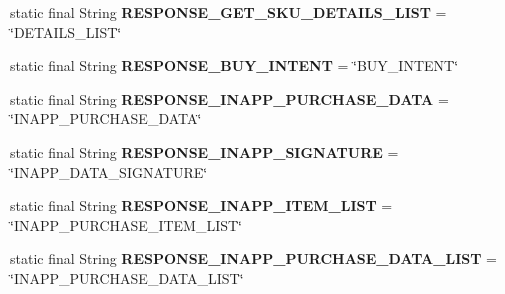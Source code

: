 \begin{DoxyCompactItemize}
\item 
\mbox{\label{classorg_1_1cocos2dx_1_1plugin_1_1util_1_1IabHelper_a63e0f9791ba6e5e4af0da4b0020474f4}} 
static final String {\bfseries R\+E\+S\+P\+O\+N\+S\+E\+\_\+\+G\+E\+T\+\_\+\+S\+K\+U\+\_\+\+D\+E\+T\+A\+I\+L\+S\+\_\+\+L\+I\+ST} = \char`\"{}D\+E\+T\+A\+I\+L\+S\+\_\+\+L\+I\+ST\char`\"{}
\item 
\mbox{\label{classorg_1_1cocos2dx_1_1plugin_1_1util_1_1IabHelper_a2e13b89999d88713b3d85d83e86e7f65}} 
static final String {\bfseries R\+E\+S\+P\+O\+N\+S\+E\+\_\+\+B\+U\+Y\+\_\+\+I\+N\+T\+E\+NT} = \char`\"{}B\+U\+Y\+\_\+\+I\+N\+T\+E\+NT\char`\"{}
\item 
\mbox{\label{classorg_1_1cocos2dx_1_1plugin_1_1util_1_1IabHelper_ad2ea748b4ca40bc25042c650b603a462}} 
static final String {\bfseries R\+E\+S\+P\+O\+N\+S\+E\+\_\+\+I\+N\+A\+P\+P\+\_\+\+P\+U\+R\+C\+H\+A\+S\+E\+\_\+\+D\+A\+TA} = \char`\"{}I\+N\+A\+P\+P\+\_\+\+P\+U\+R\+C\+H\+A\+S\+E\+\_\+\+D\+A\+TA\char`\"{}
\item 
\mbox{\label{classorg_1_1cocos2dx_1_1plugin_1_1util_1_1IabHelper_a5c2fd9dbc829224bf7056dee2813493a}} 
static final String {\bfseries R\+E\+S\+P\+O\+N\+S\+E\+\_\+\+I\+N\+A\+P\+P\+\_\+\+S\+I\+G\+N\+A\+T\+U\+RE} = \char`\"{}I\+N\+A\+P\+P\+\_\+\+D\+A\+T\+A\+\_\+\+S\+I\+G\+N\+A\+T\+U\+RE\char`\"{}
\item 
\mbox{\label{classorg_1_1cocos2dx_1_1plugin_1_1util_1_1IabHelper_a75946cde7212f83faaa3a61990535d9d}} 
static final String {\bfseries R\+E\+S\+P\+O\+N\+S\+E\+\_\+\+I\+N\+A\+P\+P\+\_\+\+I\+T\+E\+M\+\_\+\+L\+I\+ST} = \char`\"{}I\+N\+A\+P\+P\+\_\+\+P\+U\+R\+C\+H\+A\+S\+E\+\_\+\+I\+T\+E\+M\+\_\+\+L\+I\+ST\char`\"{}
\item 
\mbox{\label{classorg_1_1cocos2dx_1_1plugin_1_1util_1_1IabHelper_af0445d042a4acaea8ec337c818275c03}} 
static final String {\bfseries R\+E\+S\+P\+O\+N\+S\+E\+\_\+\+I\+N\+A\+P\+P\+\_\+\+P\+U\+R\+C\+H\+A\+S\+E\+\_\+\+D\+A\+T\+A\+\_\+\+L\+I\+ST} = \char`\"{}I\+N\+A\+P\+P\+\_\+\+P\+U\+R\+C\+H\+A\+S\+E\+\_\+\+D\+A\+T\+A\+\_\+\+L\+I\+ST\char`\"{}

\end{DoxyCompactItemize}
